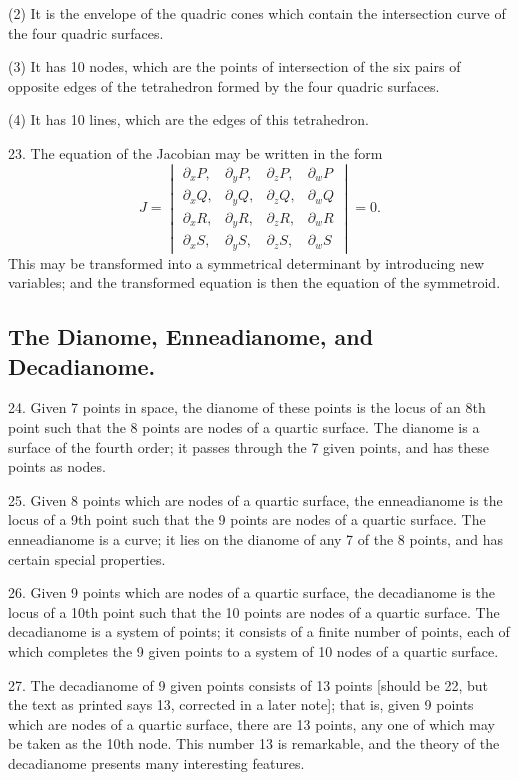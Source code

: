 \documentclass[11pt,a4paper]{article}
\begin{document}
(2) It is the envelope of the quadric cones which contain the intersection curve of the four quadric surfaces.

(3) It has 10 nodes, which are the points of intersection of the six pairs of opposite edges of the tetrahedron formed by the four quadric surfaces.

(4) It has 10 lines, which are the edges of this tetrahedron.

23. The equation of the Jacobian may be written in the form
\[
J = \begin{vmatrix}
\partial_x P, & \partial_y P, & \partial_z P, & \partial_w P \\
\partial_x Q, & \partial_y Q, & \partial_z Q, & \partial_w Q \\
\partial_x R, & \partial_y R, & \partial_z R, & \partial_w R \\
\partial_x S, & \partial_y S, & \partial_z S, & \partial_w S
\end{vmatrix} = 0.
\]
This may be transformed into a symmetrical determinant by introducing new variables; and the transformed equation is then the equation of the symmetroid.

\subsection*{The Dianome, Enneadianome, and Decadianome.}

24. Given 7 points in space, the dianome of these points is the locus of an 8th point such that the 8 points are nodes of a quartic surface. The dianome is a surface of the fourth order; it passes through the 7 given points, and has these points as nodes.

25. Given 8 points which are nodes of a quartic surface, the enneadianome is the locus of a 9th point such that the 9 points are nodes of a quartic surface. The enneadianome is a curve; it lies on the dianome of any 7 of the 8 points, and has certain special properties.

26. Given 9 points which are nodes of a quartic surface, the decadianome is the locus of a 10th point such that the 10 points are nodes of a quartic surface. The decadianome is a system of points; it consists of a finite number of points, each of which completes the 9 given points to a system of 10 nodes of a quartic surface.

27. The decadianome of 9 given points consists of 13 points [should be 22, but the text as printed says 13, corrected in a later note]; that is, given 9 points which are nodes of a quartic surface, there are 13 points, any one of which may be taken as the 10th node. This number 13 is remarkable, and the theory of the decadianome presents many interesting features.
\end{document}
